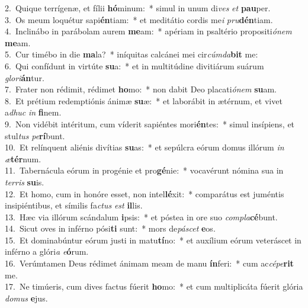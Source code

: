 {2.~}Quique terrígenæ, et fílii \textbf{hó}minum:~* simul in unum di\textit{ves} \textit{et} \textbf{pau}per.\\
{3.~}Os meum loquétur sapi\textbf{én}tiam:~* et meditátio cordis me\textit{i} \textit{pru}\textbf{dén}tiam.\\
{4.~}Inclinábo in parábolam aurem \textbf{me}am:~* apériam in psaltério propositi\textit{ó}\textit{nem} \textbf{me}am.\\
{5.~}Cur timébo in die \textbf{ma}la?~* iníquitas calcánei mei cir\textit{cúm}\textit{da}\textbf{bit} me:\\
{6.~}Qui confídunt in virtúte \textbf{su}a:~* et in multitúdine divitiárum suárum \textit{glo}\textit{ri}\textbf{án}tur.\\
{7.~}Frater non rédimit, rédimet \textbf{ho}mo:~* non dabit Deo placati\textit{ó}\textit{nem} \textbf{su}am.\\
{8.~}Et prétium redemptiónis ánimæ \textbf{su}æ:~* et laborábit in ætérnum, et vivet a\textit{dhuc} \textit{in} \textbf{fi}nem.\\
{9.~}Non vidébit intéritum, cum víderit sapiéntes mori\textbf{én}tes:~* simul insípiens, et stul\textit{tus} \textit{pe}\textbf{rí}bunt.\\
{10.~}Et relínquent aliénis divítias \textbf{su}as:~* et sepúlcra eórum domus illórum \textit{in} \textit{æ}\textbf{tér}num.\\
{11.~}Tabernácula eórum in progénie et pro\textbf{gé}nie:~* vocavérunt nómina sua in \textit{ter}\textit{ris} \textbf{su}is.\\
{12.~}Et homo, cum in honóre esset, non intel\textbf{lé}xit:~* comparátus est juméntis insipiéntibus, et símilis fa\textit{ctus} \textit{est} \textbf{il}lis.\\
{13.~}Hæc via illórum scándalum \textbf{i}psis:~* et póstea in ore suo \textit{com}\textit{pla}\textbf{cé}bunt.\\
{14.~}Sicut oves in inférno pósi\textbf{ti} sunt:~* mors de\textit{pá}\textit{scet} \textbf{e}os.\\
{15.~}Et dominabúntur eórum justi in matu\textbf{tí}no:~* et auxílium eórum veteráscet in inférno a glóri\textit{a} \textit{e}\textbf{ó}rum.\\
{16.~}Verúmtamen Deus rédimet ánimam meam de manu \textbf{ín}feri:~* cum ac\textit{cé}\textit{pe}\textbf{rit} me.\\
{17.~}Ne timúeris, cum dives factus fúerit \textbf{ho}mo:~* et cum multiplicáta fúerit glória \textit{do}\textit{mus} \textbf{e}jus.\\
